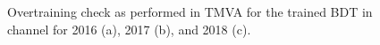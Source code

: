 \begin{figure}[htbp]
  \centering
  \caption{Overtraining check as performed in TMVA for the trained BDT in \Hemu channel for 2016 (a), 2017 (b), and 2018 (c).}
  \label{fig:etaumu_bdttrain}
\end{figure}
